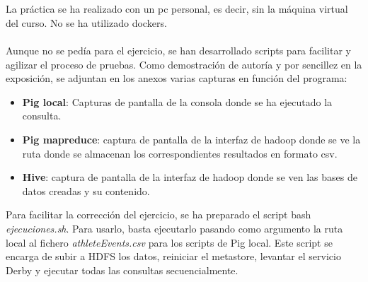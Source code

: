 \section*{}
La práctica se ha realizado con un pc personal, es decir, sin la máquina virtual del curso. No se ha utilizado dockers.\\\\
Aunque no se pedía para el ejercicio, se han desarrollado scripts para facilitar y agilizar el proceso de pruebas.
Como demostración de autoría y por sencillez en la exposición, se adjuntan en los anexos varias capturas en función del programa:
\begin{itemize}
	\item \textbf{Pig local}: Capturas de pantalla de la consola donde se ha ejecutado la consulta.
	\item \textbf{Pig mapreduce}: captura de pantalla de la interfaz de hadoop donde se ve la ruta donde se almacenan los correspondientes resultados en formato csv.
	\item \textbf{Hive}: captura de pantalla de la interfaz de hadoop donde se ven las bases de datos creadas y su contenido.
\end{itemize}
Para facilitar la corrección del ejercicio, se ha preparado el script bash \textit{ejecuciones.sh}. Para usarlo, basta ejecutarlo pasando como argumento la ruta local al fichero \textit{athleteEvents.csv} para los scripts de Pig local. Este script se encarga de subir a HDFS los datos, reiniciar el metastore, levantar el servicio Derby y ejecutar todas las consultas secuencialmente.\\\\
\pagebreak
